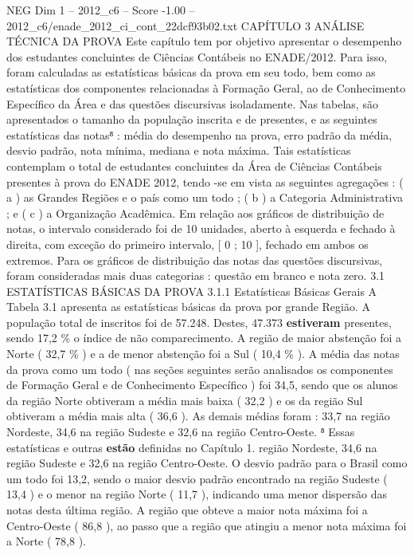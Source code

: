 \begin{textsample}{NEG Dim 1 – 2012\_c6 – Score -1.00 – 2012\_c6/enade\_2012\_ci\_cont\_22dcf93b02.txt}  \label{ex:f1_neg_258}
CAPÍTULO 3 ANÁLISE TÉCNICA DA PROVA Este capítulo tem por objetivo apresentar o desempenho dos estudantes concluintes de Ciências Contábeis no ENADE/2012.
Para isso, foram calculadas as estatísticas básicas da prova em seu todo, bem como as estatísticas dos componentes relacionadas à Formação Geral, ao de Conhecimento Específico da Área e das questões discursivas isoladamente.
Nas tabelas, são apresentados o tamanho da população inscrita e de presentes, e as seguintes estatísticas das notas⁸ : média do desempenho na prova, erro padrão da média, desvio padrão, nota mínima, mediana e nota máxima.
Tais estatísticas contemplam o total de estudantes concluintes da Área de Ciências Contábeis presentes à prova do ENADE 2012, tendo -se em vista as seguintes agregações : ( a ) as Grandes Regiões e o país como um todo ; ( b ) a Categoria Administrativa ; e ( c ) a Organização Acadêmica.
Em relação aos gráficos de distribuição de notas, o intervalo considerado foi de 10 unidades, aberto à esquerda e fechado à direita, com exceção do primeiro intervalo, [ 0 ; 10 ], fechado em ambos os extremos.
Para os gráficos de distribuição das notas das questões discursivas, foram consideradas mais duas categorias : questão em branco e nota zero. 3.1 ESTATÍSTICAS BÁSICAS DA PROVA 3.1.1 Estatísticas Básicas Gerais A Tabela 3.1 apresenta as estatísticas básicas da prova por grande Região.
A população total de inscritos foi de 57.248.
Destes, 47.373 \textbf{estiveram} presentes, sendo 17,2 \% o índice de não comparecimento.
A região de maior abstenção foi a Norte ( 32,7 \% ) e a de menor abstenção foi a Sul ( 10,4 \% ).
A média das notas da prova como um todo ( nas seções seguintes serão analisados os componentes de Formação Geral e de Conhecimento Específico ) foi 34,5, sendo que os alunos da região Norte obtiveram a média mais baixa ( 32,2 ) e os da região Sul obtiveram a média mais alta ( 36,6 ).
As demais médias foram : 33,7 na região Nordeste, 34,6 na região Sudeste e 32,6 na região Centro-Oeste. ⁸ Essas estatísticas e outras \textbf{estão} definidas no Capítulo 1. região Nordeste, 34,6 na região Sudeste e 32,6 na região Centro-Oeste.
O desvio padrão para o Brasil como um todo foi 13,2, sendo o maior desvio padrão encontrado na região Sudeste ( 13,4 ) e o menor na região Norte ( 11,7 ), indicando uma menor dispersão das notas desta última região.
A região que obteve a maior nota máxima foi a Centro-Oeste ( 86,8 ), ao passo que a região que atingiu a menor nota máxima foi a Norte ( 78,8 ).

\end{textsample}
